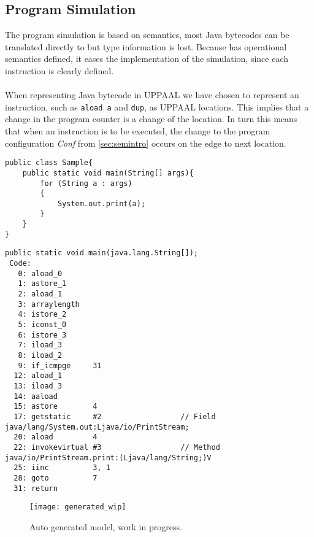 \subsection{Program Simulation}
The program simulation is based on \jcl semantics, most Java bytecodes can be translated directly to \jcl but type information is lost. Because \jcl has operational semantics defined, it eases the implementation of the simulation, since each instruction is clearly defined.\\\\
When representing Java bytecode in UPPAAL we have chosen to represent an instruction, such as \texttt{aload a} and \texttt{dup}, as UPPAAL locations. 
This implies that a change in the program counter is a change of the location. 
In turn this means that when an instruction is to be executed, the change to the program configuration \textit{Conf} from  \cref{sec:semintro} occurs on the edge to next location.

\begin{minipage}{\linewidth}
\begin{lstlisting}[caption=Java code sample.]
public class Sample{
    public static void main(String[] args){
        for (String a : args)         
        {
            System.out.print(a);
        }
    }
}
\end{lstlisting}
\end{minipage}
\begin{minipage}{\linewidth}
\begin{lstlisting}[caption=Bytecode sample.]
public static void main(java.lang.String[]);
 Code:
   0: aload_0       
   1: astore_1      
   2: aload_1       
   3: arraylength   
   4: istore_2      
   5: iconst_0      
   6: istore_3      
   7: iload_3       
   8: iload_2       
   9: if_icmpge     31
  12: aload_1       
  13: iload_3       
  14: aaload        
  15: astore        4
  17: getstatic     #2                  // Field java/lang/System.out:Ljava/io/PrintStream;
  20: aload         4
  22: invokevirtual #3                  // Method java/io/PrintStream.print:(Ljava/lang/String;)V
  25: iinc          3, 1
  28: goto          7
  31: return        

\end{lstlisting}
\end{minipage}

\begin{figure}[H]
\texttt{[image: generated\_wip]}
\caption{Auto generated model, work in progress.}
\label{fig:generated_wip}
\end{figure}

